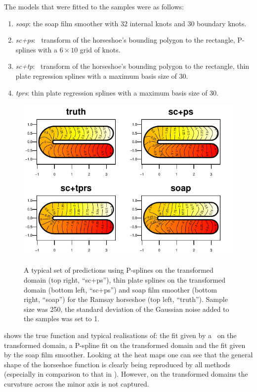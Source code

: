 The models that were fitted to the samples were as follows:
\begin{enumerate}
\item \textit{soap}: the soap film smoother with 32 internal knots and 30 boundary knots.
\item \textit{sc+ps}: \sch\ transform of the horseshoe's bounding polygon to the rectangle, P-splines with a $6 \times 10$ grid of knots.
\item \textit{sc+tp}: \sch\ transform of the horseshoe's bounding polygon to the rectangle, thin plate regression splines with a maximum basis size of 30.
\item \textit{tprs}: thin plate regression splines with a maximum basis size of 30.
\end{enumerate}

\begin{figure}[t]
\centering
\includegraphics[width=\textwidth]{sc/figs/compsmooth.pdf} \\
\caption{A typical set of predictions using P-splines on the transformed domain (top right, ``sc+ps''), thin plate splines on the transformed domain (bottom left, ``sc+ps'') and soap film smoother (bottom right, ``soap'') for the Ramsay horseshoe (top left, ``truth''). Sample size was 250, the standard deviation of the Gaussian noise added to the samples was set to 1.}
\label{compsmooth}
\end{figure}

 shows the true function and typical realisations of: the fit given by a \tprs\ on the transformed domain, a P-spline fit on the transformed domain and the fit given by the soap film smoother. Looking at the heat maps one can see that the general shape of the horseshoe function is clearly being reproduced by all methods (especially in comparison to that in ). However, on the transformed domains the curvature across the minor axis is not captured.

